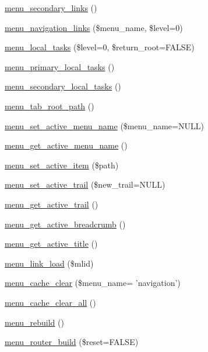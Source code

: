 \begin{CompactItemize}
\item 
\hyperlink{group__menu_gea7d8f0da28d4082b03e6cadf7af69bd}{menu\_\-secondary\_\-links} ()
\item 
\hyperlink{group__menu_gb4cdacc813ae9e06271aa4aa2d9495a7}{menu\_\-navigation\_\-links} (\$menu\_\-name, \$level=0)
\item 
\hyperlink{group__menu_g6641ad95c6f964fbdc3f594d86696569}{menu\_\-local\_\-tasks} (\$level=0, \$return\_\-root=FALSE)
\item 
\hyperlink{group__menu_g83613b83f90d6a12e2f4170ed0ede9b1}{menu\_\-primary\_\-local\_\-tasks} ()
\item 
\hyperlink{group__menu_gbf84c295da2c986cd8ad305935e31ffb}{menu\_\-secondary\_\-local\_\-tasks} ()
\item 
\hyperlink{group__menu_gcf647362fc7151bbaa1dbe5568a0b6b5}{menu\_\-tab\_\-root\_\-path} ()
\item 
\hyperlink{group__menu_g017400eafe570a87460d4e6a4a305407}{menu\_\-set\_\-active\_\-menu\_\-name} (\$menu\_\-name=NULL)
\item 
\hyperlink{group__menu_g7f449034a05c47e985f5ce8ec31344e2}{menu\_\-get\_\-active\_\-menu\_\-name} ()
\item 
\hyperlink{group__menu_gcdd22102c2ba6545645ae34be563d1d4}{menu\_\-set\_\-active\_\-item} (\$path)
\item 
\hyperlink{group__menu_g9328a9a4f297d8bb095d924e75a8abd7}{menu\_\-set\_\-active\_\-trail} (\$new\_\-trail=NULL)
\item 
\hyperlink{group__menu_g55105d602c5c5ea5b39aae25aa47f8c5}{menu\_\-get\_\-active\_\-trail} ()
\item 
\hyperlink{group__menu_g009731c4b3e736ebb620ba90e7f04207}{menu\_\-get\_\-active\_\-breadcrumb} ()
\item 
\hyperlink{group__menu_gf0a358447097959e53ad1a20b8d811ed}{menu\_\-get\_\-active\_\-title} ()
\item 
\hyperlink{group__menu_gc2b338fa3a449c826661aade7a7d486e}{menu\_\-link\_\-load} (\$mlid)
\item 
\hyperlink{group__menu_g032d6b78c7deab10685ebfa6f32ad7eb}{menu\_\-cache\_\-clear} (\$menu\_\-name= 'navigation')
\item 
\hyperlink{group__menu_g0a10fa44ca152a12091747e515b6a655}{menu\_\-cache\_\-clear\_\-all} ()
\item 
\hyperlink{group__menu_gf36dcb9d5491ef5e7d2cf22c1f5c69f4}{menu\_\-rebuild} ()
\item 
\hyperlink{group__menu_ge6e2fcdb614d7988c160c22d563919ba}{menu\_\-router\_\-build} (\$reset=FALSE)

\end{CompactItemize}
